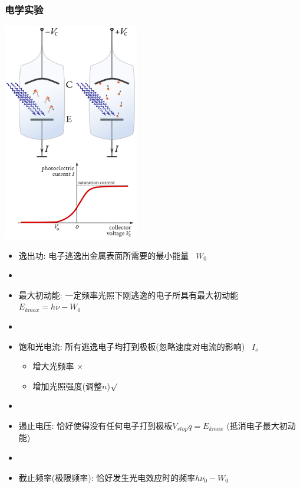 \documentclass{article}
\begin{document}
\subsubsection{电学实验}
\begin{minipage}{0.45 \textwidth}
    \includegraphics[width=16em,keepaspectratio]{./pictures/11.png}
\end{minipage}
\hspace{-2em}
\begin{minipage}{0.5\textwidth}
    \begin{itemize}
        \item 逸出功: 电子逃逸出金属表面所需要的最小能量 \, $W_{0}$
        \item[]
        \item 最大初动能: 一定频率光照下刚逃逸的电子所具有最大初动能 $E_{kmax} = h\nu - W_{0}$
        \item[]
        \item 饱和光电流: 所有逃逸电子均打到极板(忽略速度对电流的影响) \, $I_{s}$
              \begin{itemize}
                  \item[] 增大光频率 $\times$
                  \item[] 增加光照强度(调整$n$)$\surd$
              \end{itemize}
        \item[]
        \item 遏止电压: 恰好使得没有任何电子打到极板$V_{stop}q = E_{kmax}$ (抵消电子最大初动能)
        \item[]
        \item 截止频率(极限频率): 恰好发生光电效应时的频率$ h\nu_{0} - W_{0} $
    \end{itemize}
\end{minipage}
\end{document}
